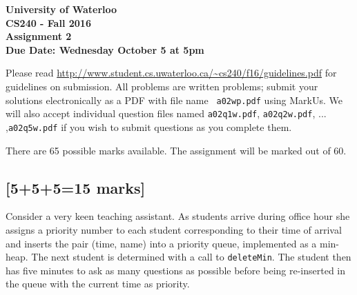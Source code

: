 \documentclass[12pt]{article}
\begin{document}
\vspace*{-2cm}
\begin{center}
{\Large\bf University of Waterloo}\\
\vspace{3mm}
{\Large\bf CS240 - Fall 2016}\\
\vspace{2mm}
{\Large\bf Assignment 2}\\
\vspace{3mm}
\textbf{Due Date: Wednesday October 5 at 5pm}
\end{center}

\def\question#1{\item[\bf #1.]}
\def\part#1{\item[\bf #1)]}
\newcommand{\pc}[1]{\mbox{\textbf{#1}}} %

Please read
\url{http://www.student.cs.uwaterloo.ca/~cs240/f16/guidelines.pdf}
for guidelines on submission.  All problems are written problems;
submit your solutions electronically as a PDF with file name {\tt
a02wp.pdf} using MarkUs. We will also accept individual question
files named {\tt a02q1w.pdf}, {\tt a02q2w.pdf}, ... ,{\tt a02q5w.pdf}
if you wish to submit questions as you complete them.  

There are 65 possible marks available.  The assignment will be
marked out of 60.

\subsection{[5+5+5=15 marks]}
Consider a very keen teaching assistant.
As students arrive during office hour she assigns a priority number
to each student corresponding to their time of arrival and inserts the
pair (time, name) into a priority queue, implemented as a min-heap. The
next student is determined with a call to {\tt deleteMin}. The student
then has five minutes to ask as many questions as possible before being
re-inserted in the queue with the current time as priority.
\end{document}
